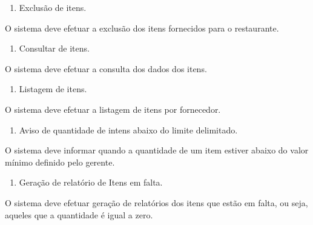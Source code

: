\liststyleWWNumi
\setcounter{saveenum}{\value{enumi}}
\begin{enumerate}
\setcounter{enumi}{\value{saveenum}}
\item {
\textcolor[rgb]{0.078431375,0.09411765,0.13725491}{Exclusão de itens.}}
\end{enumerate}
{
\textcolor[rgb]{0.078431375,0.09411765,0.13725491}{O sistema deve efetuar a exclusão dos itens fornecidos para o
restaurante.}}

\liststyleWWNumi
\setcounter{saveenum}{\value{enumi}}
\begin{enumerate}
\setcounter{enumi}{\value{saveenum}}
\item {
\textcolor[rgb]{0.078431375,0.09411765,0.13725491}{Consultar de itens.}}
\end{enumerate}
{
\textcolor[rgb]{0.078431375,0.09411765,0.13725491}{O sistema deve efetuar a consulta dos dados dos itens.}}

\liststyleWWNumi
\setcounter{saveenum}{\value{enumi}}
\begin{enumerate}
\setcounter{enumi}{\value{saveenum}}
\item {
\textcolor[rgb]{0.078431375,0.09411765,0.13725491}{Listagem de itens.}}
\end{enumerate}
{
\textcolor[rgb]{0.078431375,0.09411765,0.13725491}{O sistema deve efetuar a listagem de itens por fornecedor.}}

\liststyleWWNumi
\setcounter{saveenum}{\value{enumi}}
\begin{enumerate}
\setcounter{enumi}{\value{saveenum}}
\item {
\textcolor[rgb]{0.078431375,0.09411765,0.13725491}{Aviso de quantidade de intens abaixo do limite delimitado.}}
\end{enumerate}
{
\textcolor[rgb]{0.078431375,0.09411765,0.13725491}{O sistema deve informar quando a quantidade de um item estiver abaixo
do valor mínimo definido pelo gerente.}}

\liststyleWWNumi
\setcounter{saveenum}{\value{enumi}}
\begin{enumerate}
\setcounter{enumi}{\value{saveenum}}
\item {
\textcolor[rgb]{0.078431375,0.09411765,0.13725491}{Geração de relatório de Itens em falta.}}
\end{enumerate}
{
\textcolor[rgb]{0.078431375,0.09411765,0.13725491}{O sistema deve efetuar geração de relatórios dos itens que estão em
falta, ou seja, aqueles que a quantidade é igual a zero.}}


